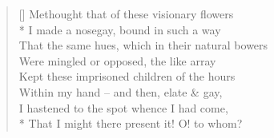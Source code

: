 \documentclass[MAIN]{subfiles}
\begin{document}
\begin{verse}[\versewidth]
Methought that of these visionary flowers\\*
\vin I made a nosegay, bound in such a way\\
That the same hues, which in their natural bowers\\
\vin Were mingled or opposed, the like array\\
Kept these imprisoned children of the hours\\
\vin Within my hand -- and then, elate \& gay,\\
I hastened to the spot whence I had come,\\*
That I might there present it! O! to whom?
\end{verse}
\end{document}
